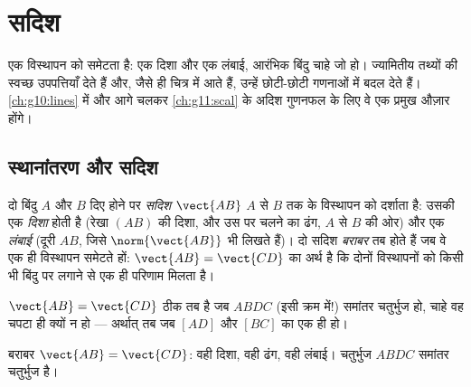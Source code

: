 \chapter{सदिश}\label{ch:g10:vectors}

 एक विस्थापन को समेटता है: एक दिशा और एक लंबाई, आरंभिक बिंदु चाहे जो हो।
 ज्यामितीय तथ्यों की स्वच्छ उपपत्तियाँ देते हैं और, जैसे ही 
चित्र में आते हैं, उन्हें छोटी-छोटी गणनाओं में बदल देते हैं। \cref{ch:g10:lines} में और आगे
चलकर \cref{ch:g11:scal} के अदिश गुणनफल के लिए वे एक प्रमुख औज़ार होंगे।

\section{स्थानांतरण और सदिश}

\begin{definition}[सदिश]\label{def:g10:vectors:vector}
दो बिंदु $A$ और $B$ दिए होने पर \emph{सदिश} $\vect{AB}$ $A$ से $B$ तक
के विस्थापन को दर्शाता है: उसकी एक \emph{दिशा} होती है (रेखा $(AB)$ की दिशा,
और उस पर चलने का ढंग, $A$ से $B$ की ओर) और एक \emph{लंबाई} (दूरी $AB$,
जिसे $\norm{\vect{AB}}$ भी लिखते हैं)। दो सदिश \emph{बराबर} तब होते हैं जब वे एक ही
विस्थापन समेटते हों: $\vect{AB} = \vect{CD}$ का अर्थ है कि दोनों विस्थापनों को किसी भी बिंदु
पर लगाने से एक ही परिणाम मिलता है।
\end{definition}

\begin{proposition}[बराबर सदिश और समांतर चतुर्भुज]\label{prop:g10:vectors:parallelogram}
$\vect{AB} = \vect{CD}$ ठीक तब है जब $ABDC$ (इसी क्रम में!) समांतर चतुर्भुज हो, चाहे वह चपटा ही
क्यों न हो --- अर्थात् तब जब $[AD]$ और $[BC]$ का  एक ही हो।
\end{proposition}
\admitted

\begin{omfigure}

{\small बराबर  $\vect{AB} = \vect{CD}$: वही दिशा, वही ढंग, वही लंबाई। चतुर्भुज $ABDC$
समांतर चतुर्भुज है।}
\end{omfigure}

